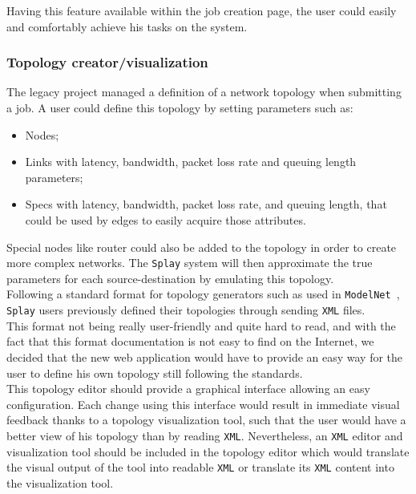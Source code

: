 \documentclass{eplmastersthesis}
\begin{document}
          Having this feature available within the job creation page, the user
          could easily and comfortably achieve his tasks on the system.

        \subsubsection{Topology creator/visualization}

          The legacy project managed a definition of a network topology when
          submitting a job. A user could define this topology by setting
          parameters such as:

          \begin{itemize}
            \item Nodes;
            \item Links with latency, bandwidth, packet loss rate and queuing
            length parameters;
            \item Specs with latency, bandwidth, packet loss rate, and queuing
            length, that could be used by edges to easily acquire those
            attributes.
          \end{itemize}

          Special nodes like router could also be added to the topology in order
          to create more complex networks. The \texttt{Splay} system will then
          approximate the true parameters for each source-destination by
          emulating this topology.\\

          Following a standard format for topology generators such as
          used in \texttt{ModelNet}~\cite{ModelNet}, \texttt{Splay} users previously
          defined their topologies through sending \texttt{XML} files.\\
          This format not being really user-friendly and quite hard to read,
          and with the fact that this format documentation is not easy to find
          on the Internet, we decided that the new web application would have
          to provide an easy way for the user to define his own topology
          still following the standards.\\

          This topology editor should provide a graphical interface
          allowing an easy configuration. Each change using this interface
          would result in immediate visual feedback thanks to a topology
          visualization tool, such that the user would have a better view of
          his topology than by reading \texttt{XML}. Nevertheless, an \texttt{XML} editor and
          visualization tool should be included in the topology editor which
          would translate the visual output of the tool into readable \texttt{XML} or
          translate its \texttt{XML} content into the visualization tool.\\
\end{document}
